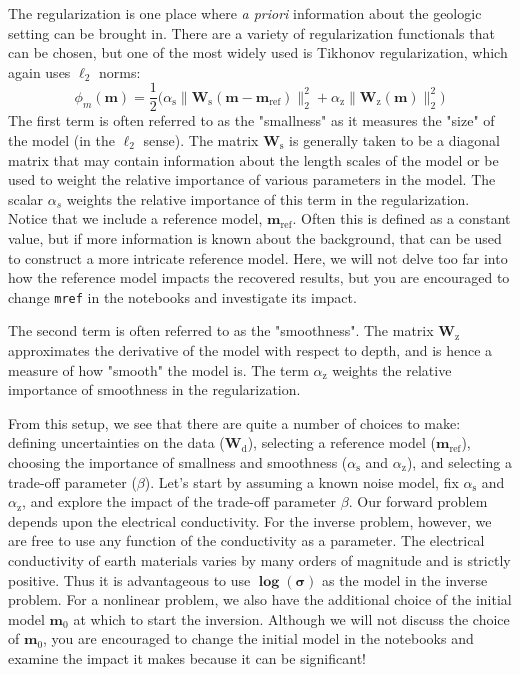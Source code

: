 \documentclass[11pt,oneside]{article}
\begin{document}
The regularization is one place where \emph{a priori} information about the geologic setting can be brought in. There are a variety of regularization functionals that can be chosen, but one of the most widely used is Tikhonov regularization, which again uses $\ell_2$ norms:
\begin{equation}
\phi_m(\mathbf{m}) = \frac{1}{2}\big(\alpha_\mathrm{s}\|\mathbf{W_\mathrm{s}} (\mathbf{m} - \mathbf{m}_{\text{ref}})\|^2_2 + \alpha_\mathrm{z}\|\mathbf{W_\mathrm{z}} (\mathbf{m})\|^2_2 \big)
\end{equation}
The first term is often referred to as the "smallness" as it measures the "size" of the model (in the $\ell_2$ sense). The matrix $\mathbf{W_\mathrm{s}}$ is generally taken to be a diagonal matrix that may contain information about the length scales of the model or be used to weight the relative importance of various parameters in the model. The scalar $\alpha_s$ weights the relative importance of this term in the regularization. Notice that we include a reference model, $\mathbf{m}_{\text{ref}}$. Often this is defined as a constant value, but if more information is known about the background, that can be used to construct a more intricate reference model. Here, we will not delve too far into how the reference model impacts the recovered results, but you are encouraged to change \texttt{mref} in the notebooks and investigate its impact.

The second term is often referred to as the "smoothness". The matrix $\mathbf{W_\mathrm{z}}$ approximates the derivative of the model with respect to depth, and is hence a measure of how "smooth" the model is. The term $\alpha_\mathrm{z}$ weights the relative importance of smoothness in the regularization.

From this setup, we see that there are quite a number of choices to make: defining uncertainties on the data ($\mathbf{W_\mathrm{d}}$), selecting a reference model ($\mathbf{m}_{\text{ref}}$), choosing the importance of smallness and smoothness ($\alpha_\mathrm{s}$ and $\alpha_\mathrm{z}$), and selecting a trade-off parameter ($\beta$). Let’s start by assuming a known noise model, fix $\alpha_\mathrm{s}$ and $\alpha_\mathrm{z}$, and explore the impact of the trade-off parameter $\beta$. Our forward problem depends upon the electrical conductivity. For the inverse problem, however, we are free to use any function of the conductivity as a parameter. The electrical conductivity of earth materials varies by many orders of magnitude and is strictly positive. Thus it is advantageous to use $\mathbf{\log(\sigma)}$ as the model in the inverse problem. For a nonlinear problem, we also have the additional choice of the initial model $\mathbf{m}_0$ at which to start the inversion. Although we will not discuss the choice of $\mathbf{m}_0$, you are encouraged to change the initial model in the notebooks and examine the impact it makes because it can be significant!
\end{document}

